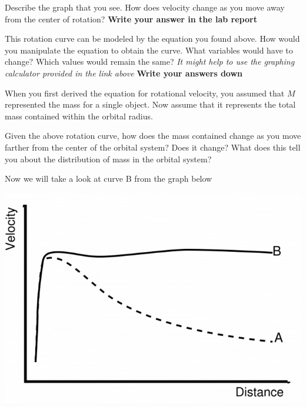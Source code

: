 \begin{steps}
	\item Describe the graph  that you see. How does velocity change as you move away from the center of rotation? \textbf{Write your answer in the lab report}
	
	\item This rotation curve can be modeled by the equation you found above. How would you manipulate the equation to obtain the curve. What variables would have to change? Which values would remain the same? \textit{It might help  to use the graphing calculator provided in the link above} \textbf{Write your answers down}
	
\end{steps} 

When you first derived the equation for rotational velocity, you assumed that $M$ represented the mass for a single object. Now assume that it represents the total mass contained within the orbital radius. 

\begin{steps}
	\item Given the above rotation curve, how does the mass contained change as you move farther from the center of the orbital system? Does it change? What does this tell you about the distribution of mass in the orbital system?
\end{steps}

Now we will take a look at curve B from the graph below
	
\includegraphics[scale = .5]{srt-background-rotation/galactic_rotation_curve}

